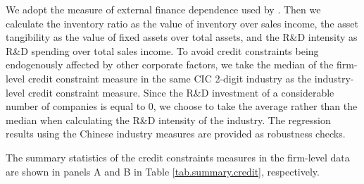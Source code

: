 \documentclass[12pt]{article}
\begin{document}
We adopt the measure of external finance dependence used by \cite{fan-lai-li2015}. Then we calculate the inventory ratio as the value of inventory over sales income, the asset tangibility as the value of fixed assets over total assets, and the R\&D intensity as R\&D spending over total sales income. To avoid credit constraints being endogenously affected by other corporate factors, we take the median of the firm-level credit constraint measure in the same CIC 2-digit industry as the industry-level credit constraint measure. Since the R\&D investment of a considerable number of companies is equal to 0, we choose to take the average rather than the median when calculating the R\&D intensity of the industry. The regression results using the Chinese industry measures are provided as robustness checks.

The summary statistics of the credit constraints measures in the firm-level data are shown in panels A and B in Table \ref{tab.summary.credit}, respectively.
\end{document}
